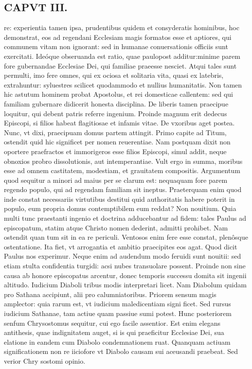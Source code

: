 \documentclass{article}
\begin{document}
\begin{pages}
\section*{CAPVT III. }
\marginpar{[ p.35 ]}\pstart re: experientia tamen ipsa, prudentibus quidem et consyderatis hominibus, hoc demonstrat, eos ad regendani Ecclesiam magis formatos esse et aptiores, qui communem vitam non ignorant: sed in humanae conuersationis officiis sunt exercitati. Ideóque obseruanda est ratio, quae paulopost additur:minime parem fore gubernandae Ecclesiae Dei, qui familiae praeesse nesciet. Atqui tales sunt permulti, imo fere omnes, qui ex ociosa et solitaria vita, quasi ex latebris, extrahuntur: syluestres scilicet quodammodo et nullius humanitatis. Non tamen hic astutum hominem probat Apostolus, et rei domesticae callentem: sed qui familiam gubernare didicerit honesta disciplina. De liberis tamen praecipue loquitur, qui debent patris referre ingenium. Proinde magnum erit dedecus Episcopi, si filios habeat flagitiosae et infamis vitae. De vxoribus aget postea. Nunc, vt dixi, praecipuam domus partem attingit. Primo capite ad Titum, ostendit quid hic significet per nomen reuerentiae. Nam postquam dixit non oportere praefractos et immorigeros esse filios Episcopi, simul addit, neque obnoxios probro dissolutionis, aut intemperantiae. Vult ergo in summa, moribus esse ad omnem castitatem, modestiam, et grauitatem compositis. Argumentum quod sequitur a minori ad maius per se clarum est: nequaquam fore parem regendo populo, qui ad regendam familiam sit ineptus. Praeterquam enim quod inde constat necessariis virtutibus destitui quid authoritatis habere poterit in populo, eum propria domus contemptibilem eum reddat?  \pend\pstart Non nouitium. Quia multi tunc praestanti ingenio et doctrina adducebantur ad fidem: tales Paulus ad episcopatum, statim atque Christo nomen dederint, admitti prohibet. Nam ostendit quan tum sit in ea re periculi. Ventosos enim fere esse constat, plenôsque ostentatione. Ita fiet, vt arrogantia et ambitio praecipites eos agat. Quod dicit Paulus nos experimur. Neque enim ad audendum modo feruidi sunt nouitii: sed etiam stulta confidentia turgidi: acsi nubes transuolare possent. Proinde non sine causa ab honore episcopatus arcentur, donec temporis successu domita sit ingenii altitudo. Iudicium Diaboli tribus modis interpretari licet. Nam Diabolum quidam pro Sathana accipiunt, alii pro calumniatoribus. Priorem sensum magis amplector: quia rarum est, vt iudicium maledicentiam signi ficet. Sed rursus iudicium Sathanae, tam actiue quam passiue sumi potest. Hunc posteriorem senfum Chrysostomus sequitur, cui ego facile assentior. Est enim elegans antithesis, quae indignitatem auget, si is qui praeficitur Ecclesiae Dei, sua elatione in eandem cum Diabolo condemnationem ruat. Quanquam actiuam significationem non re iiciofore vt Diabolo causam sui aceusandi praebeat. Sed verior Chry sostomi opinio.  \pend

\end{pages}
\end{document}
